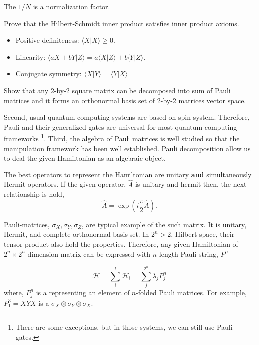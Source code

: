 The $1/N$ is a normalization factor. 

\begin{exercise}
    Prove that the Hilbert-Schmidt inner product satisfies inner product axioms.

    \begin{itemize}
        \item Positive definiteness: $\langle X | X \rangle \geq 0$.
        \item Linearity: $\langle a X+ bY | Z \rangle = a \langle X | Z \rangle + b \langle Y | Z \rangle$.
        \item Conjugate symmetry: $\langle X | Y \rangle = \overline{\langle Y | X \rangle}$
    \end{itemize}
\end{exercise}

\begin{exercise}
    Show that any 2-by-2 square matrix can be decomposed into sum of Pauli matrices 
    and it forms an orthonormal basis set of 2-by-2 matrices vector space.
\end{exercise}

Second, usual quantum computing systems are based on spin system.
Therefore, Pauli and their generalized gates are universal for most quantum computing frameworks
\footnote{There are some exceptions, but in those systems, we can still use Pauli gates.}.
Third, the algebra of Pauli matrices is well studied so that the manipulation framework has been well established.
Pauli decomposition allow us to deal the given Hamiltonian as an algebraic object.

The best operators to represent the Hamiltonian are unitary \textbf{and} simultaneously Hermit operators. 
If the given operator, $\hat{A}$ is unitary and hermit then, the next relationship is hold,
\begin{equation}
    \hat{A} = \exp(i \frac{\pi}{2}\hat{A}).
\end{equation}

Pauli-matrices, $\sigma_{X}, \sigma_{Y}, \sigma_{Z}$, are typical example of the such matrix.
It is unitary, Hermit, and complete orthonormal basis set. 
In $2^n>2$, Hilbert space, their tensor product also hold the properties.
Therefore, any given Hamiltonian of $2^n \times 2^n$ dimension matrix can be expressed with $n$-length Pauli-string, 
$P^n$

\begin{equation}
    \label{eq:Pauli-decompositon}
    \mathcal{H} = \sum_i^l \mathcal{H}_i = \sum_j^{2^n} \lambda_j P_j^n
\end{equation}
where, $P_j^n$ is a representing an element of $n$-folded Pauli matrices.
For example, $P_1^3 = XYX$ is a $\sigma_X \otimes \sigma_Y \otimes \sigma_X$. 

